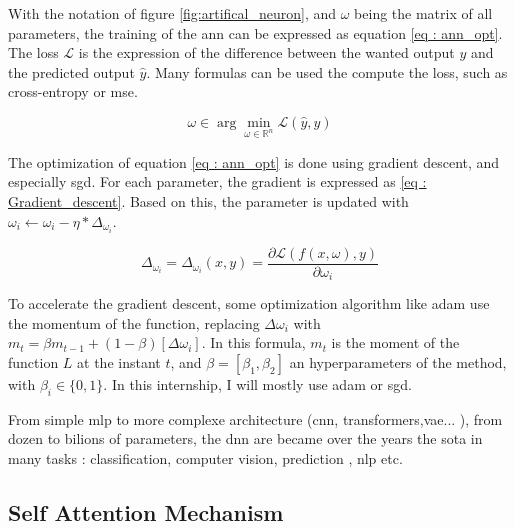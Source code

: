 With the notation of figure \ref{fig:artifical_neuron}, and $\omega$ being the matrix of all parameters, the training of the \acrshort{ann} can be expressed as equation \ref{eq : ann_opt}. The loss $\mathcal L$ is the expression of the difference between the wanted output $y$ and the predicted output $\hat y$. Many formulas can be used the compute the loss, such as cross-entropy\cite{zhang_generalized_2018} or \acrfull{mse}.

\begin{equation}
    \omega \in \arg \min_{\omega \in \mathbb R^n} \mathcal L(\hat{y},y)
    \label{eq : ann_opt}
\end{equation}

The optimization of equation \ref{eq : ann_opt} is done using gradient descent, and especially \acrfull{sgd}. For each parameter, the gradient is expressed as \ref{eq : Gradient_descent}. Based on this, the parameter is updated with $\omega_{i} \gets \omega_i - \eta * \Delta_{\omega_i}$.

\begin{equation}
    \Delta_{\omega_i}=\Delta_{\omega_i}(x,y)=\frac{\partial \mathcal L(f(x,\omega),y)}{\partial \omega_i}
\label{eq : Gradient_descent}
\end{equation}

To accelerate the gradient descent, some optimization algorithm like \acrfull{adam} \cite{kingma_adam_2017} use the momentum of the function, replacing $\Delta \omega_i$ with $m_t = \beta m_{t-1}+(1-\beta)[\Delta \omega_i]$. In this formula, $m_t$ is the moment of the function $L$ at the instant $t$, and $\beta = [\beta_1, \beta_2]$ an hyperparameters of the method, with $\beta_i \in \{0,1\}$. In this internship, I will mostly use \acrshort{adam} or \acrshort{sgd}.

From simple \acrfull{mlp} to more complexe architecture (\acrfull{cnn}, \Glspl{transformer},\acrfull{vae}... ), from dozen to bilions of parameters, the \acrshort{dnn} are became over the years the \acrfull{sota} in many tasks : classification\cite{zhang_neural_2000}, computer vision\cite{rawat_deep_2017}, prediction \cite{khosravi_comprehensive_2011}, \acrshort{nlp}\cite{goldberg_primer_2016} etc.

\subsection{Self Attention Mechanism}
\label{sec:self_att}



